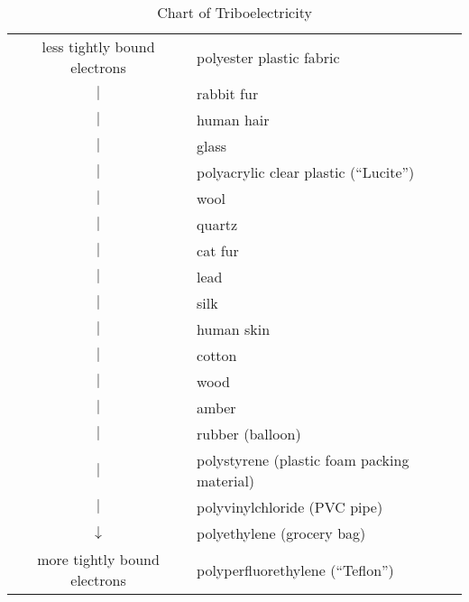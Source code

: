 \begin{table}[htdp]
\caption{Chart of Triboelectricity}
\begin{tabular}{cl} \hline
\centering
less tightly bound electrons	
	  		& polyester plastic fabric \\
$|$		  	& rabbit fur \\
$|$			& human hair \\
$|$			& glass \\
$|$			& polyacrylic clear plastic (``Lucite'') \\
$|$			& wool \\
$|$			& quartz \\
$|$			& cat fur \\
$|$			& lead \\
$|$			& silk \\
$|$			& human skin \\
$|$			& cotton \\
$|$			& wood \\
$|$			& amber \\
$|$			& rubber (balloon) \\
$|$			& polystyrene (plastic foam packing material) \\
$|$			& polyvinylchloride (PVC pipe) \\
$\downarrow$ 	& polyethylene (grocery bag) \\
more tightly bound electrons
	& polyperfluorethylene (``Teflon'') \\
\hline

\end{tabular}
\end{table}
\endinput
